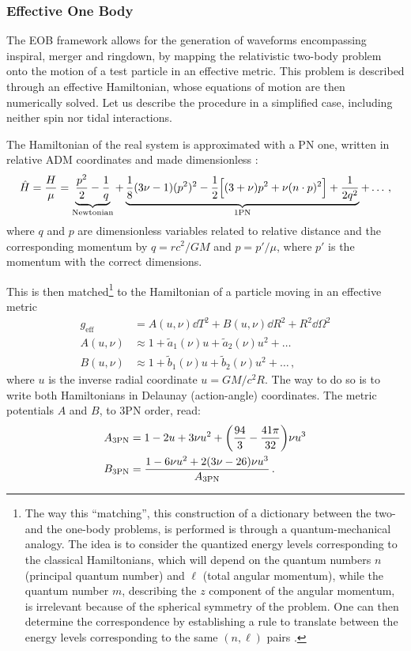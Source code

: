 \documentclass[main.tex]{subfiles}
\begin{document}
\subsubsection{Effective One Body} \label{sec:eob}

The \ac{EOB} framework allows for the generation of waveforms encompassing inspiral, merger and ringdown, by mapping the relativistic two-body problem onto the motion of a test particle in an effective metric. 
This problem is described through an effective Hamiltonian, whose equations of motion are then numerically solved. 
Let us describe the procedure in a simplified case, including neither spin nor tidal interactions. 

The Hamiltonian of the real system is approximated with a \ac{PN} one, written in relative \ac{ADM} coordinates and made dimensionless \cite[eqs.\ 4--5]{damourGeneralRelativisticTwo2014}: 
%
\begin{align}
\hat{H} = \frac{H}{\mu } = \underbrace{\frac{p^2}{2} - \frac{1}{q}}_{\text{Newtonian}} 
+ \underbrace{\frac{1}{8} (3 \nu -1 ) (p^2)^2 - \frac{1}{2} \qty[(3+\nu ) p^2 + \nu (n \cdot p)^2] + \frac{1}{2 q^2}}_{\text{1PN}} + \dots
\,,
\end{align}
% 
where \(q\) and \(p\) are dimensionless variables related to relative distance and the corresponding
momentum by \(q = r c^2 / GM\) and \(p = p' / \mu \), where \(p'\) is the momentum with the correct dimensions.  

This is then matched\footnote{The way this ``matching'', this construction of a dictionary between the two- and the one-body problems, is performed is through a quantum-mechanical analogy. The idea is to consider the quantized energy levels corresponding to the classical Hamiltonians, which will depend on the quantum numbers \(n\) (principal quantum number) and \(\ell\) (total angular momentum),  while the quantum number \(m\), describing  the \(z\) component of the angular momentum, is irrelevant because of the spherical symmetry of the problem. One can then determine the correspondence by establishing a rule to translate between the energy levels corresponding to the same \((n, \ell)\) pairs \cite{damourGeneralRelativisticTwo2014}.} to the Hamiltonian of a particle moving in an effective metric 
%
\begin{align}
g _{\text{eff}} &= A(u, \nu ) \dd{T^2} + B(u, \nu) \dd{R^2} + R^2 \dd{\Omega^2}  \\
A(u, \nu ) &\approx 1 + \widetilde{a}_1 (\nu ) u + \widetilde{a}_2 (\nu ) u^2 + \dots  \\
B(u, \nu ) &\approx 1 + \widetilde{b}_1 (\nu ) u + \widetilde{b}_2 (\nu ) u^2 + \dots  
\,,
\end{align}
%
where \(u\) is the inverse radial coordinate \(u = GM / c^2 R\). 
The way to do so is to write both Hamiltonians in Delaunay (action-angle) coordinates. 
The metric potentials \(A\) and \(B\), to 3PN order, read: 
%
\begin{align}
A _{\text{3PN}} &= 1 - 2u + 3 \nu u^2 + \qty( \frac{94}{3} - \frac{41 \pi }{32}) \nu u^3  \\
B _{\text{3PN}} &= \frac{1 - 6 \nu u^2 + 2 (3 \nu - 26) \nu u^3}{A _{\text{3PN}}}
\,.
\end{align}
\end{document}
